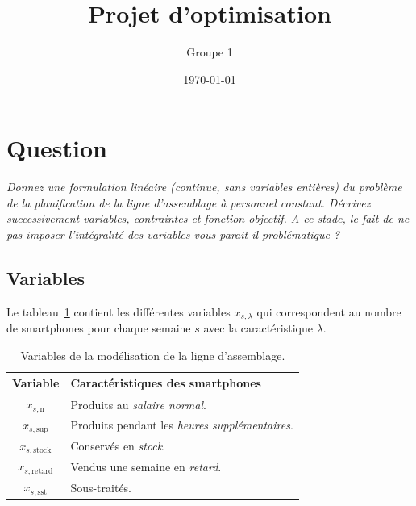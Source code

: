 \documentclass[12pt,oneside,a4paper]{article}
\title{Projet d'optimisation}
\author{Groupe 1}
\date{\today}
\newcommand{\question}
{
\addtocounter{section}{1}
\section*{Question \thesection}
}
\newcommand{\myX}[2]{x_{#1,\text{#2}}}
\newcommand{\xSemaine}[1]{\myX{s}{#1}}
\newcommand{\xn}{\xSemaine{n}}
\newcommand{\xsup}{\xSemaine{sup}}
\newcommand{\xstock}{\xSemaine{stock}}
\newcommand{\xretard}{\xSemaine{retard}}
\newcommand{\xsst}{\xSemaine{sst}}
\begin{document}
\maketitle

\question %
\emph{Donnez une formulation linéaire (continue, sans variables entières) 
du problème de la planification de la ligne d'assemblage à personnel constant.
Décrivez successivement variables, contraintes et fonction objectif. 
A ce stade, le fait de ne pas imposer l'intégralité des variables 
vous parait-il problématique ?}

\subsection*{Variables}
Le tableau~\ref{tab:variablesQuestion1} contient les différentes variables $x_{s,\lambda}$
qui correspondent au nombre de smartphones pour chaque semaine $s$
avec la caractéristique $\lambda$.

\begin{table}[h]
  \begin{center}
  \begin{tabular}{|c|l|}
    \hline
    Variable & Caractéristiques des smartphones \\
    \hline
    \hline
    $\xn$ & Produits au \emph{salaire normal}. \\
    \hline
    $\xsup$ & Produits pendant les \emph{heures supplémentaires}. \\
    \hline
    $\xstock$ & Conservés en \emph{stock}. \\
    \hline
    $\xretard$ & Vendus une semaine en \emph{retard}. \\
    \hline
    $\xsst$ & Sous-traités. \\
    \hline
  \end{tabular}
  \caption{Variables de la modélisation de la ligne d'assemblage.}
  \label{tab:variablesQuestion1}
  \end{center}
\end{table}
\end{document}
